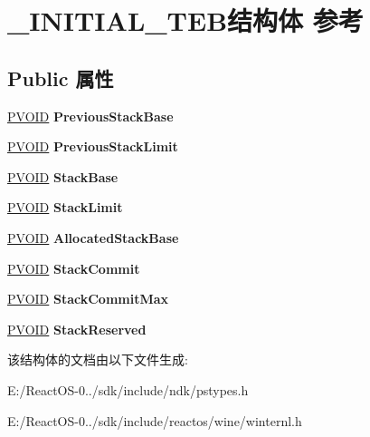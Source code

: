 \hypertarget{struct___i_n_i_t_i_a_l___t_e_b}{}\section{\+\_\+\+I\+N\+I\+T\+I\+A\+L\+\_\+\+T\+E\+B结构体 参考}
\label{struct___i_n_i_t_i_a_l___t_e_b}
\subsection*{Public 属性}
\begin{DoxyCompactItemize}
\item 
\mbox{\label{struct___i_n_i_t_i_a_l___t_e_b_a146403fc6947fd12ce4bc74311a35a64}} 
\hyperlink{interfacevoid}{P\+V\+O\+ID} {\bfseries Previous\+Stack\+Base}
\item 
\mbox{\label{struct___i_n_i_t_i_a_l___t_e_b_ad908c014d5af2594fc9d12626bba4c3e}} 
\hyperlink{interfacevoid}{P\+V\+O\+ID} {\bfseries Previous\+Stack\+Limit}
\item 
\mbox{\label{struct___i_n_i_t_i_a_l___t_e_b_a13437bda722ecc146005d46a5500beaa}} 
\hyperlink{interfacevoid}{P\+V\+O\+ID} {\bfseries Stack\+Base}
\item 
\mbox{\label{struct___i_n_i_t_i_a_l___t_e_b_abc46fe95f51b69e51a9daaa887ef5875}} 
\hyperlink{interfacevoid}{P\+V\+O\+ID} {\bfseries Stack\+Limit}
\item 
\mbox{\label{struct___i_n_i_t_i_a_l___t_e_b_aae64b4ebe74977dbd25150b4661f5410}} 
\hyperlink{interfacevoid}{P\+V\+O\+ID} {\bfseries Allocated\+Stack\+Base}
\item 
\mbox{\label{struct___i_n_i_t_i_a_l___t_e_b_a19e3a90f0a1c67adaa0a9eb871ae636a}} 
\hyperlink{interfacevoid}{P\+V\+O\+ID} {\bfseries Stack\+Commit}
\item 
\mbox{\label{struct___i_n_i_t_i_a_l___t_e_b_a8fb6f7971442a699cabac94eba17a198}} 
\hyperlink{interfacevoid}{P\+V\+O\+ID} {\bfseries Stack\+Commit\+Max}
\item 
\mbox{\label{struct___i_n_i_t_i_a_l___t_e_b_ae3df3f96f7b92af1b40c1d948267fdcb}} 
\hyperlink{interfacevoid}{P\+V\+O\+ID} {\bfseries Stack\+Reserved}
\end{DoxyCompactItemize}


该结构体的文档由以下文件生成\+:\begin{DoxyCompactItemize}
\item 
E\+:/\+React\+O\+S-\/0../sdk/include/ndk/pstypes.\+h\item 
E\+:/\+React\+O\+S-\/0../sdk/include/reactos/wine/winternl.\+h\end{DoxyCompactItemize}
